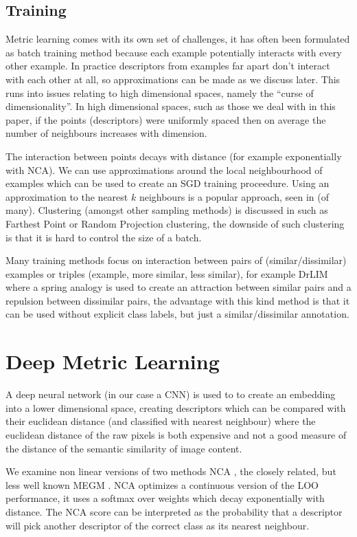 \subsection {Training}

Metric learning comes with its own set of challenges, it has often been formulated as batch training method because each example potentially interacts with every other example. In practice descriptors from examples far apart don't interact with each other at all, so approximations can be made as we discuss later. This runs into issues relating to high dimensional spaces, namely the ``curse of dimensionality''. In high dimensional spaces, such as those we deal with in this paper, if the points (descriptors) were uniformly spaced then on average the number of neighbours increases with dimension. 

The interaction between points decays with distance (for example exponentially with \gls{NCA}). We can use approximations around the local neighbourhood of examples which can be used to create an \gls{SGD} training proceedure. Using an approximation to the nearest $ k $ neighbours is a popular approach, seen in \cite{Mensink2012,Zaidi2011} (of many). Clustering (amongst other sampling methods) is discussed in  \cite{Oneat2011} such as Farthest Point or Random Projection clustering, the downside of such clustering is that it is hard to control the size of a batch. 

Many training methods focus on interaction between pairs of (similar/dissimilar) examples or triples (example, more similar, less similar), for example DrLIM \cite{Hadsell2006} where a spring analogy is used to create an attraction between similar pairs and a repulsion between dissimilar pairs, the advantage with this kind method is that it can be used without explicit class labels, but just a similar/dissimilar annotation.

\section {Deep Metric Learning}

A deep neural network (in our case a \gls{CNN}) is used to to create an embedding into a lower dimensional space, creating descriptors which can be compared with their euclidean distance (and classified with nearest neighbour) where the euclidean distance of the raw pixels is both expensive and not a good measure of the distance of the semantic similarity of image content. 

We examine non linear versions of two methods \gls{NCA} \cite{Goldberger2004}, the closely related, but less well known \gls{MEGM} \cite {Zaidi2011}. \gls{NCA} optimizes a continuous version of the \gls{LOO} performance, it uses a softmax over weights which decay exponentially with distance. The \gls{NCA} score can be interpreted as the probability that a descriptor will pick another descriptor of the correct class as its nearest neighbour. 

